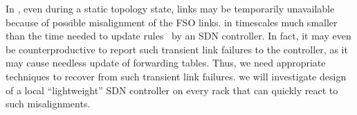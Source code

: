  In \ArchName,
even during a static topology state, links may be temporarily
unavailable because of possible misalignment of the FSO
links.  in timescales much smaller than
the time needed to update rules~\cite{ddcnsdi13} by an SDN
controller. In fact, it may even be counterproductive to report such
transient link failures to the controller, as it may cause needless
update of forwarding tables. Thus, we need appropriate  techniques to recover from such transient link
failures.  we will investigate
design of a local ``lightweight'' SDN controller on every rack that
can quickly react to such misalignments.
